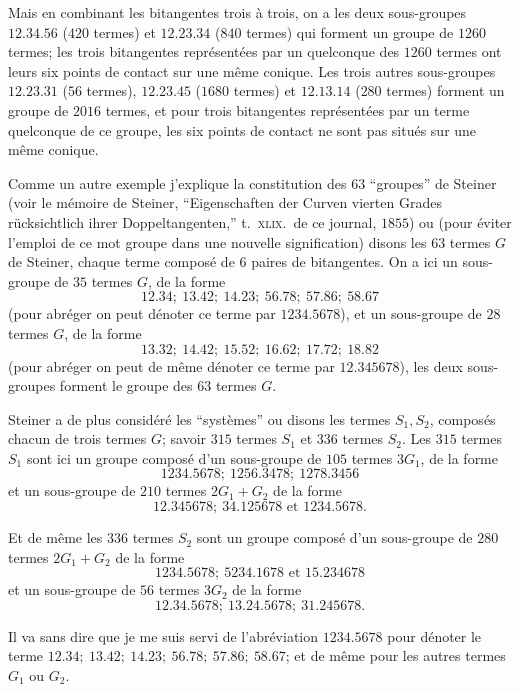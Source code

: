 \documentclass[11pt,a4paper]{article}
\begin{document}
Mais en combinant les bitangentes trois \`a trois, on a les deux sous-groupes
$12.34.56$ ($420$ termes) et $12.23.34$ ($840$ termes) qui forment un groupe de $1260$
termes; les trois bitangentes repr\'esent\'ees par un quelconque des $1260$ termes ont
leurs six points de contact sur une m\^eme conique. Les trois autres sous-groupes
$12.23.31$ ($56$ termes), $12.23.45$ ($1680$ termes) et $12.13.14$ ($280$ termes) forment
un groupe de $2016$ termes, et pour trois bitangentes repr\'esent\'ees par un terme
quelconque de ce groupe, les six points de contact ne sont pas situ\'es sur une m\^eme
conique.

Comme un autre exemple j'explique la constitution des $63$ ``groupes'' de Steiner
(voir le m\'emoire de Steiner, ``Eigenschaften der Curven vierten Grades r\"ucksichtlich
ihrer Doppeltangenten,'' t.\ \textsc{xlix}.\ de ce journal, $1855$) ou (pour \'eviter
l'emploi de ce mot groupe dans une nouvelle signification) disons les $63$ termes $G$
de Steiner, chaque terme compos\'e de $6$ paires de bitangentes. On a ici un sous-groupe
de $35$ termes $G$, de la forme
\[
12.34;\ 13.42;\ 14.23;\ 56.78;\ 57.86;\ 58.67
\]
(pour abr\'eger on peut d\'enoter ce terme par $1234.5678$), et un sous-groupe de $28$
termes $G$, de la forme
\[
13.32;\ 14.42;\ 15.52;\ 16.62;\ 17.72;\ 18.82
\]
(pour abr\'eger on peut de m\^eme d\'enoter ce terme par $12.345678$), les deux
sous-groupes forment le groupe des $63$ termes $G$.

Steiner a de plus consid\'er\'e les ``syst\`emes'' ou disons les termes $S_1, S_2$,
compos\'es chacun de trois termes $G$; savoir $315$ termes $S_1$ et $336$ termes $S_2$.
Les $315$ termes $S_1$ sont ici un groupe compos\'e d'un sous-groupe de $105$ termes $3G_1$,
de la forme
\[
1234.5678;\ 1256.3478;\ 1278.3456
\]
et un sous-groupe de $210$ termes $2 G_1 + G_2$ de la forme
\[
12.345678;\ 34.125678 \text{ et } 1234.5678.
\]

Et de m\^eme les $336$ termes $S_2$ sont un groupe compos\'e d'un sous-groupe de $280$
termes $2 G_1 + G_2$ de la forme
\[
1234.5678;\ 5234.1678 \text{ et } 15.234678
\]
et un sous-groupe de $56$ termes $3 G_2$ de la forme
\[
12.34.5678;\ 13.24.5678;\ 31.245678.
\]

Il va sans dire que je me suis servi de l'abr\'eviation $1234.5678$ pour d\'enoter le
terme $12.34;\ 13.42;\ 14.23;\ 56.78;\ 57.86;\ 58.67$; et de m\^eme pour les autres
termes $G_1$ ou $G_2$.
\end{document}
